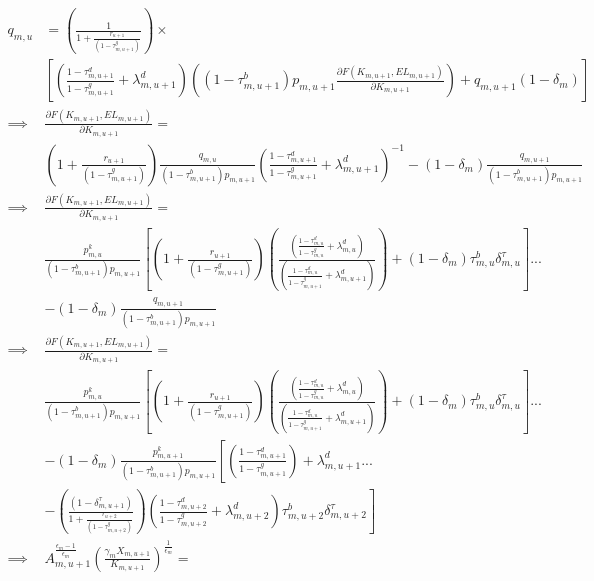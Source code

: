 \documentclass[letterpaper,12pt]{article}
\theoremstyle{definition}
\begin{document}
\begin{spacing}{1.5}
\begin{equation}
\label{eqn:solve_k_demand_tax}
\begin{split}
 q_{m,u} &=  \left(\frac{1}{1+\frac{r_{u+1}}{(1-\tau^{g}_{m,u+1})}}\right) \times  \\
& \left[\left(\frac{1-\tau^{d}_{m,u+1}}{1-\tau^{g}_{m,u+1}}+\lambda^{d}_{m,u+1}\right)\left((1-\tau^{b}_{m,u+1})p_{m,u+1}\frac{\partial F(K_{m,u+1},EL_{m,u+1})}{\partial K_{m,u+1}}\right) + q_{m,u+1}(1-\delta_{m}) \right]  \\
\implies & \frac{\partial F(K_{m,u+1},EL_{m,u+1})}{\partial K_{m,u+1}} =  \\
& \left(1+\frac{r_{u+1}}{(1-\tau^{g}_{m,u+1})}\right)\frac{q_{m,u}}{(1-\tau^{b}_{m,u+1})p_{m,u+1}}\left(\frac{1-\tau^{d}_{m,u+1}}{1-\tau^{g}_{m,u+1}}+\lambda^{d}_{m,u+1}\right)^{-1}-(1-\delta_{m})\frac{q_{m,u+1}}{(1-\tau^{b}_{m,u+1})p_{m,u+1}} \\
\implies & \frac{\partial F(K_{m,u+1},EL_{m,u+1})}{\partial K_{m,u+1}} =  \\
&\frac{p^{k}_{m,u}}{(1-\tau^{b}_{m,u+1})p_{m,u+1}}\left[ \left(1+\frac{r_{u+1}}{(1-\tau^{g}_{m,u+1})}\right) \left( \frac{\left(\frac{1-\tau^{d}_{m,u}}{1-\tau^{g}_{m,u}}+\lambda^{d}_{m,u}\right)}{\left(\frac{1-\tau^{d}_{m,u}}{1-\tau^{g}_{m,u+1}}+\lambda^{d}_{m,u+1}\right)} \right)+ (1-\delta_{m})\tau^{b}_{m,u}\delta^{\tau}_{m,u}\right] ... \\
& -(1-\delta_{m})\frac{q_{m,u+1}}{(1-\tau^{b}_{m,u+1})p_{m,u+1}} \\
\implies & \frac{\partial F(K_{m,u+1},EL_{m,u+1})}{\partial K_{m,u+1}} =  \\
&\frac{p^{k}_{m,u}}{(1-\tau^{b}_{m,u+1})p_{m,u+1}}\left[ \left(1+\frac{r_{u+1}}{(1-\tau^{g}_{m,u+1})}\right) \left( \frac{\left(\frac{1-\tau^{d}_{m,u}}{1-\tau^{g}_{m,u}}+\lambda^{d}_{m,u}\right)}{\left(\frac{1-\tau^{d}_{m,u}}{1-\tau^{g}_{m,u+1}}+\lambda^{d}_{m,u+1}\right)} \right)+ (1-\delta_{m})\tau^{b}_{m,u}\delta^{\tau}_{m,u}\right] ... \\
& -(1-\delta_{m})\frac{p^{k}_{m,u+1}}{(1-\tau^{b}_{m,u+1})p_{m,u+1}}\left[\left(\frac{1-\tau^{d}_{m,u+1}}{1-\tau^{g}_{m,u+1}}\right) + \lambda^{d}_{m,u+1} ... \right. \\
& \left.  -  \left(\frac{(1-\delta^{\tau}_{m,u+1})}{1+\frac{r_{u+2}}{(1-\tau^{g}_{m,u+2})}}\right)  \left(\frac{1-\tau^{d}_{m,u+2}}{1-\tau^{g}_{m,u+2}}+\lambda^{d}_{m,u+2}\right)\tau^{b}_{m,u+2}\delta^{\tau}_{m,u+2} \right]  \\
\implies & A_{m,u+1}^{\frac{\epsilon_{m}-1}{\epsilon_{m}}}\left(\frac{\gamma_{m}X_{m,u+1}}{K_{m,u+1}}\right)^{\frac{1}{\epsilon_{m}}} =  \\

\end{split}
\end{equation}
\end{spacing}
\end{document}
